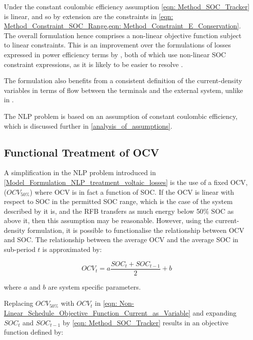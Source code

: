 \documentclass[preprint,3p,review,authoryear,10pt]{elsarticle}
\begin{document}
Under the constant coulombic efficiency assumption \cref{eqn: Method_SOC_Tracker} is linear, and so by extension are the constraints in \cref{eqn: Method_Constraint_SOC_Range,eqn: Method_Constraint_E_Conservation}.  The overall formulation hence comprises a non-linear objective function subject to linear constraints. This is an improvement over the formulations of losses expressed in power efficiency terms by \cite{Nguyen2015,Sarker2017}, both of which use non-linear SOC constraint expressions, as it is likely to be easier to resolve \cite{Hart2017}.

The formulation also benefits from a consistent definition of the current-density variables in terms of flow between the terminals and the external system, unlike in \cite{Sarker2017}.

The NLP problem is based on an assumption of constant coulombic efficiency, which is discussed further in \cref{analysis_of_assumptions}.

\subsection{Functional Treatment of OCV}
\label{Model_Formulation_Functional_Treatment_OCV}
A simplification in the NLP problem introduced in \cref{Model_Formulation_NLP_treatment_voltaic_losses} is the use of a fixed OCV, ($OCV_{50\%}$) where OCV is in fact a function of SOC. If the OCV is linear with respect to SOC in the permitted SOC range, which is the case of the system described by \cite{Reed2016} it is, and the RFB transfers as much energy below 50\% SOC as above it, then this assumption may be reasonable. However, using the current-density formulation, it is possible to functionalise the relationship between OCV and SOC. The relationship between the average OCV and the average SOC in sub-period $t$ is approximated by:

\begin{equation}
\label{eqn: OCV_vs_SOC}
OCV_t = a\frac{SOC_t + SOC_{t-1}}{2} + b 
\end{equation}

where $a$ and $b$ are system specific parameters.

Replacing $OCV_{50\%}$ with $OCV_t$ in \cref{eqn: Non-Linear_Schedule_Objective_Function_Current_as_Variable} and expanding $SOC_t$ and $SOC_{t-1}$ by \cref{eqn: Method_SOC_Tracker} results in an objective function  defined by:
\end{document}
